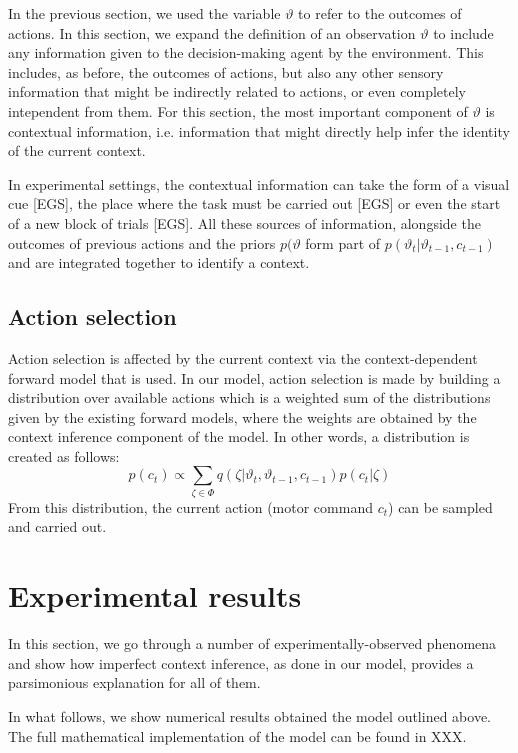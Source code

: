 \documentclass[a4paper,doc,floatsintext,natbib]{apa6}
\begin{document}
In the previous section, we used the variable $\vartheta$ to refer to the outcomes of actions. In this section, we expand the definition of an observation $\vartheta$ to include any information given to the decision-making agent by the environment. This includes, as before, the outcomes of actions, but also any other sensory information that might be indirectly related to actions, or even completely intependent from them. For this section, the most important component of $\vartheta$ is contextual information, i.e. information that might directly help infer the identity of the current context.

In experimental settings, the contextual information can take the form of a visual cue [EGS], the place where the task must be carried out [EGS] or even the start of a new block of trials [EGS]. All these sources of information, alongside the outcomes of previous actions and the priors $p(\vartheta$ form part of $p(\vartheta_t | \vartheta_{t-1}, c_{t-1})$ and are integrated together to identify a context.

\subsection{Action selection}
Action selection is affected by the current context via the context-dependent forward model that is used. In our model, action selection is made by building a distribution over available actions which is a weighted sum of the distributions given by the existing forward models, where the weights are obtained by the context inference component of the model. In other words, a distribution is created as follows:
\begin{equation}
p(c_t) \propto \displaystyle\sum_{\zeta \in \Phi}q(\zeta | \vartheta_t, \vartheta_{t-1}, c_{t-1}) p(c_t | \zeta)
\end{equation}
From this distribution, the current action (motor command $c_t$) can be sampled and carried out.

\section{Experimental results}
In this section, we go through a number of experimentally-observed phenomena and show how imperfect context inference, as done in our model, provides a parsimonious explanation for all of them.

In what follows, we show numerical results obtained the model outlined above. The full mathematical implementation of the model can be found in XXX.
\end{document}
